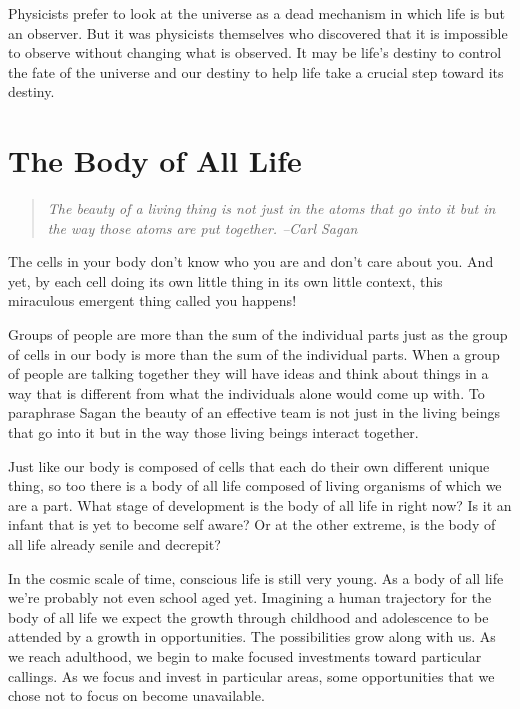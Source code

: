 \documentclass[ebook,11pt,openany,twoside]{memoir}
\begin{document}
Physicists prefer to look at the universe as a dead mechanism in which life is
but an observer. But it was physicists themselves who discovered that it is
impossible to observe without changing what is observed. It may be life's
destiny to control the fate of the universe and our destiny to help life take a
crucial step toward its destiny.

\chapter{The Body of All Life}

\begin{quote}
\em
The beauty of a living thing is not just in the atoms that go into it but in
the way those atoms are put together. --Carl Sagan
\end{quote}

The cells in your body don't know who you are and don't care about you. And
yet, by each cell doing its own little thing in its own little context, this
miraculous emergent thing called you happens!

Groups of people are more than the sum of the individual parts just as the
group of cells in our body is more than the sum of the individual parts. When a
group of people are talking together they will have ideas and think about
things in a way that is different from what the individuals alone would come up
with. To paraphrase Sagan the beauty of an effective team is not just in the
living beings that go into it but in the way those living beings interact
together.

Just like our body is composed of cells that each do their own different unique
thing, so too there is a body of all life composed of living organisms of which
we are a part. What stage of development is the body of all life in right now?
Is it an infant that is yet to become self aware? Or at the other extreme, is
the body of all life already senile and decrepit?

In the cosmic scale of time, conscious life is still very young. As a body of
all life we're probably not even school aged yet. Imagining a human trajectory
for the body of all life we expect the growth through childhood and adolescence
to be attended by a growth in opportunities. The possibilities grow along with
us. As we reach adulthood, we begin to make focused investments toward
particular callings. As we focus and invest in particular areas, some
opportunities that we chose not to focus on become unavailable.
\end{document}
